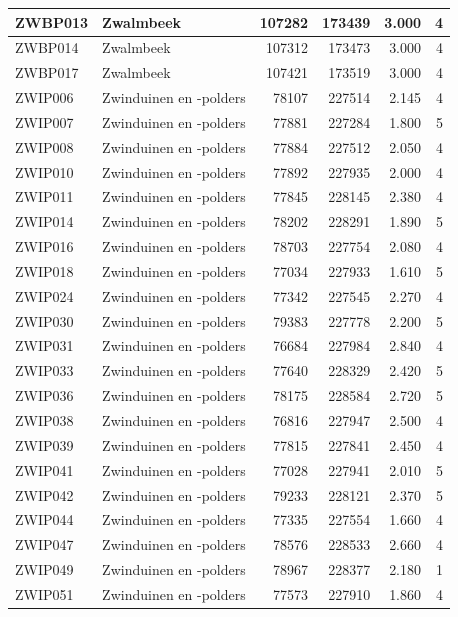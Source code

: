 \documentclass[11pt,]{book}
\begin{document}
\begin{table}
\begin{tabular}[t]{l|l|r|r|r|r}
\hline
ZWBP013 & Zwalmbeek & 107282 & 173439 & 3.000 & 4\\
\hline
ZWBP014 & Zwalmbeek & 107312 & 173473 & 3.000 & 4\\
\hline
ZWBP017 & Zwalmbeek & 107421 & 173519 & 3.000 & 4\\
\hline
ZWIP006 & Zwinduinen en -polders & 78107 & 227514 & 2.145 & 4\\
\hline
ZWIP007 & Zwinduinen en -polders & 77881 & 227284 & 1.800 & 5\\
\hline
ZWIP008 & Zwinduinen en -polders & 77884 & 227512 & 2.050 & 4\\
\hline
ZWIP010 & Zwinduinen en -polders & 77892 & 227935 & 2.000 & 4\\
\hline
ZWIP011 & Zwinduinen en -polders & 77845 & 228145 & 2.380 & 4\\
\hline
ZWIP014 & Zwinduinen en -polders & 78202 & 228291 & 1.890 & 5\\
\hline
ZWIP016 & Zwinduinen en -polders & 78703 & 227754 & 2.080 & 4\\
\hline
ZWIP018 & Zwinduinen en -polders & 77034 & 227933 & 1.610 & 5\\
\hline
ZWIP024 & Zwinduinen en -polders & 77342 & 227545 & 2.270 & 4\\
\hline
ZWIP030 & Zwinduinen en -polders & 79383 & 227778 & 2.200 & 5\\
\hline
ZWIP031 & Zwinduinen en -polders & 76684 & 227984 & 2.840 & 4\\
\hline
ZWIP033 & Zwinduinen en -polders & 77640 & 228329 & 2.420 & 5\\
\hline
ZWIP036 & Zwinduinen en -polders & 78175 & 228584 & 2.720 & 5\\
\hline
ZWIP038 & Zwinduinen en -polders & 76816 & 227947 & 2.500 & 4\\
\hline
ZWIP039 & Zwinduinen en -polders & 77815 & 227841 & 2.450 & 4\\
\hline
ZWIP041 & Zwinduinen en -polders & 77028 & 227941 & 2.010 & 5\\
\hline
ZWIP042 & Zwinduinen en -polders & 79233 & 228121 & 2.370 & 5\\
\hline
ZWIP044 & Zwinduinen en -polders & 77335 & 227554 & 1.660 & 4\\
\hline
ZWIP047 & Zwinduinen en -polders & 78576 & 228533 & 2.660 & 4\\
\hline
ZWIP049 & Zwinduinen en -polders & 78967 & 228377 & 2.180 & 1\\
\hline
ZWIP051 & Zwinduinen en -polders & 77573 & 227910 & 1.860 & 4\\

\end{tabular}
\end{table}
\end{document}
